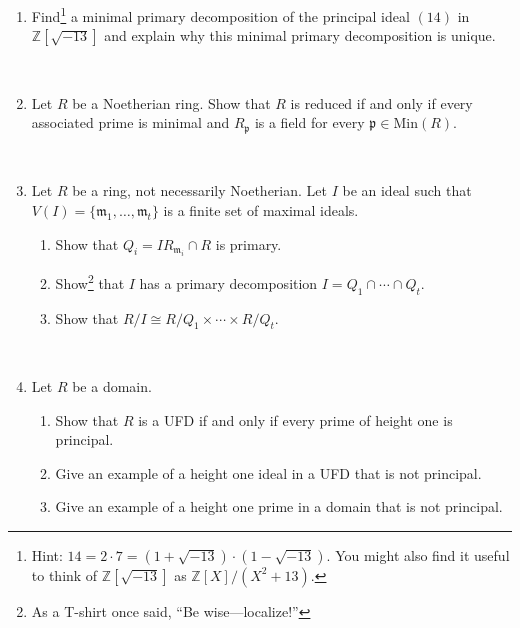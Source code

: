 \documentclass[12pt]{amsart}
\newcommand{\Z}{\mathbb{Z}}
\newcommand{\p}{\mathfrak{p}}
\newcommand{\m}{\mathfrak{m}}
\newcommand{\Min}{\mathrm{Min}}
\newcommand{\Ass}{\mathrm{Ass}}
\begin{document}
\begin{enumerate}

\item Find\footnote{Hint: $14=2\cdot 7 = (1+\sqrt{-13}) \cdot (1-\sqrt{-13})$. You might also find it useful to think of $\Z[\sqrt{-13}]$ as $\Z[X]/(X^2+13)$.} a minimal primary decomposition of the principal ideal $(14)$ in $\Z[\sqrt{-13}]$ and explain why this minimal primary decomposition is unique.

\

\item Let $R$ be a Noetherian ring. Show that $R$ is reduced if and only if every associated prime is minimal and $R_\p$ is a field for every $\p\in \Min(R)$.

\

\item Let $R$ be a ring, not necessarily Noetherian. Let $I$ be an ideal such that $V(I) = \{ \m_1,\ldots,\m_t \}$ is a finite set of maximal ideals. 
	\begin{enumerate}
		\item Show that $Q_i = I R_{\m_i} \cap R$ is primary.
		\item Show\footnote{As a T-shirt once said, ``Be wise---localize!''} that $I$ has a primary decomposition $I=Q_1 \cap \cdots \cap Q_t$.
		\item Show that $R/I \cong R/Q_1 \times \cdots \times R/Q_t$.
	\end{enumerate}


\


\item Let $R$ be a domain. 
\begin{enumerate}
\item Show that $R$ is a UFD if and only if every prime of height one is principal.
\item Give an example of a height one ideal in a UFD that is not principal.
\item Give an example of a height one prime in a domain that is not principal.
\end{enumerate}



\end{enumerate}
\end{document}
